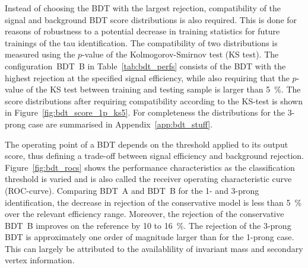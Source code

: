 Instead of choosing the BDT with the largest rejection, compatibility of the
signal and background BDT score distributions is also required. This is done for
reasons of robustness to a potential decrease in training statistics for future
trainings of the tau identification. The compatibility of two distributions is
measured using the $p$-value of the Kolmogorov-Smirnov test (KS test). The
configuration~\mbox{BDT B} in Table~\ref{tab:bdt_perfs} consists of the BDT with
the highest rejection at the specified signal efficiency, while also requiring
that the $p$-value of the KS test between training and testing sample is larger
than \SI{5}{\percent}. The score distributions after requiring compatibility
according to the KS-test is shown in Figure~\ref{fig:bdt_score_1p_ks5}. For
completeness the distributions for the 3-prong case are summarised in
Appendix~\ref{app:bdt_stuff}.

The operating point of a BDT depends on the threshold applied to its output
score, thus defining a trade-off between signal efficiency and background
rejection. Figure~\ref{fig:bdt_rocs} shows the performance characteristics as
the classification threshold is varied and is also called the receiver operating
characteristic curve (ROC-curve). Comparing \mbox{BDT A} and \mbox{BDT B} for
the 1- and 3-prong identification, the decrease in rejection of the conservative
model is less than \SI{5}{\percent} over the relevant efficiency range.
Moreover, the rejection of the conservative \mbox{BDT B} improves on the
reference by \num{10} to \SI{16}{\percent}. The rejection of the 3-prong BDT is
approximately one order of magnitude larger than for the 1-prong case. This can
largely be attributed to the availablility of invariant mass and secondary
vertex information.

